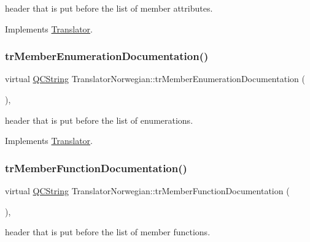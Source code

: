 header that is put before the list of member attributes. 

Implements \mbox{\hyperlink{class_translator}{Translator}}.

\mbox{\label{class_translator_norwegian_a7818e4d432d882f137c337d855082af2}} 
\subsubsection{\texorpdfstring{trMemberEnumerationDocumentation()}{trMemberEnumerationDocumentation()}}
{\footnotesize\ttfamily virtual \mbox{\hyperlink{class_q_c_string}{Q\+C\+String}} Translator\+Norwegian\+::tr\+Member\+Enumeration\+Documentation (\begin{DoxyParamCaption}{ }\end{DoxyParamCaption})\hspace{0.3cm}{\ttfamily [inline]}, {\ttfamily [virtual]}}

header that is put before the list of enumerations. 

Implements \mbox{\hyperlink{class_translator}{Translator}}.

\mbox{\label{class_translator_norwegian_ad08b4ee775802b6f1d6233da3a095caa}} 
\subsubsection{\texorpdfstring{trMemberFunctionDocumentation()}{trMemberFunctionDocumentation()}}
{\footnotesize\ttfamily virtual \mbox{\hyperlink{class_q_c_string}{Q\+C\+String}} Translator\+Norwegian\+::tr\+Member\+Function\+Documentation (\begin{DoxyParamCaption}{ }\end{DoxyParamCaption})\hspace{0.3cm}{\ttfamily [inline]}, {\ttfamily [virtual]}}

header that is put before the list of member functions. 

